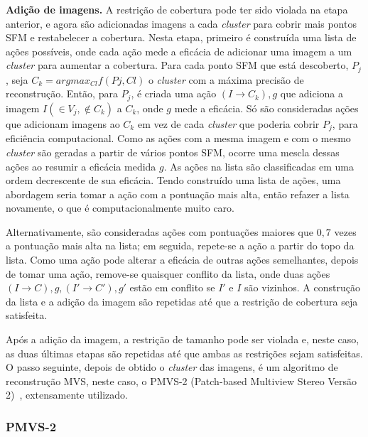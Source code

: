 \noindent\textbf{Adição de imagens.}
A restrição de cobertura pode ter sido violada na etapa anterior, e agora são
adicionadas imagens a cada \emph{cluster} para cobrir mais pontos SFM e
restabelecer a cobertura. Nesta etapa, primeiro é construída uma lista de ações
possíveis, onde cada ação mede a eficácia de adicionar uma imagem a um
\emph{cluster} para aumentar a cobertura. Para cada ponto SFM que está
descoberto, $P_j$, seja $C_k = argmax_{Cl} f(Pj, Cl)$ o \emph{cluster} com
a máxima precisão de reconstrução.  Então, para $P_j$, é criada uma ação ${(I
\rightarrow C_k), g}$ que adiciona a imagem $I (\in V_j, \not\in C_k)$ a $C_k$,
onde $g$ mede a eficácia. Só são consideradas ações que adicionam imagens ao
$C_k$ em vez de cada \emph{cluster} que poderia cobrir $P_j$, para eficiência
computacional. Como as ações com a mesma imagem e com o mesmo
\emph{cluster} são geradas a partir de vários pontos SFM, ocorre uma mescla
dessas ações ao resumir a eficácia medida $g$. As ações na lista são
classificadas em uma ordem decrescente de sua eficácia. Tendo construído uma
lista de ações, uma abordagem seria tomar a ação com a pontuação mais alta,
então refazer a lista novamente, o que é computacionalmente muito caro. 

Alternativamente, são consideradas ações com pontuações maiores que $0,7$ vezes a
pontuação mais alta na lista; em seguida, repete-se a ação a partir do topo da
lista. Como uma ação pode alterar a eficácia de outras ações semelhantes, depois
de tomar uma ação, remove-se quaisquer conflito da lista, onde duas ações ${(I
\rightarrow C), g}, {(I' \rightarrow C'), g' }$ estão em conflito se $I'$ e $I$
são vizinhos. A construção da lista e a adição da imagem são repetidas até que a
restrição de cobertura seja satisfeita.

Após a adição da imagem, a restrição de tamanho pode ser violada e, neste caso,
as duas últimas etapas são repetidas até que ambas as restrições sejam
satisfeitas.
O passo seguinte, depois de obtido o \emph{cluster} das imagens, é um algoritmo
de reconstrução MVS, neste caso, o PMVS-2 (Patch-based Multiview Stereo Versão
2)~\cite{visualSfMPMVS,Li2013,furukawa2010towards}, extensamente utilizado.

\subsubsection{PMVS-2}

